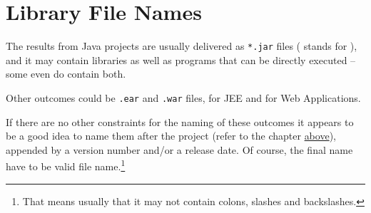 \section{Library File Names}\label{sec:LibraryFiles}
The results from Java projects are usually delivered as \verb#*.jar# files ( stands for ), and it may contain libraries as well as programs that can be directly executed – some even do contain both.

Other outcomes could be \verb#.ear# and \verb#.war# files, for JEE and for Web Applications.

If there are no other constraints for the naming of these outcomes it appears to be a good idea to name them after the project (refer to the chapter \hyperref[sec:Projects]{above}), appended by a version number and/or a release date. Of course, the final name have to be valid file name.\footnote{That means usually that it may not contain colons, slashes and backslashes.}

